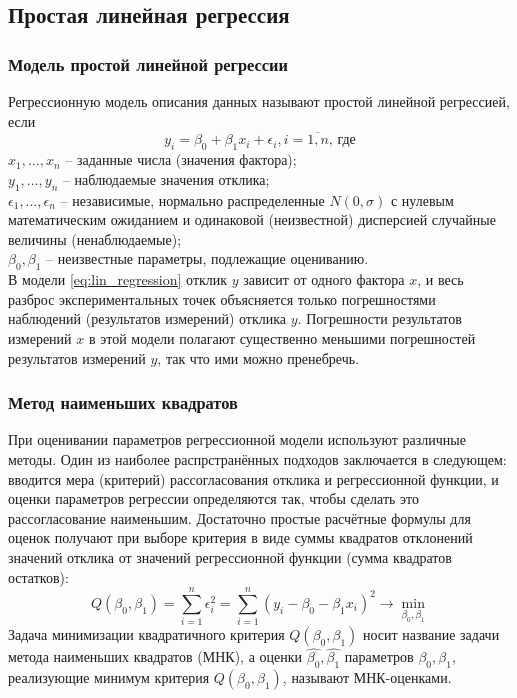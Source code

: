 \subsection{Простая линейная регрессия}

\subsubsection{Модель простой линейной регрессии}
Регрессионную модель описания данных называют простой линейной регрессией, если
\begin{equation} \label{eq:lin_regression}
	y_i = \beta_0 + \beta_1 x_i + \epsilon_i, i=\overline{1, n} \text{, где}
\end{equation}
$x_1, \dots, x_n$ -- заданные числа (значения фактора); \\
$y_1, \dots, y_n$ -- наблюдаемые значения отклика; \\
$\epsilon_1, \dots, \epsilon_n$ -- независимые, нормально распределенные $N(0, \sigma)$ с нулевым математическим ожиданием и одинаковой (неизвестной) дисперсией случайные величины (ненаблюдаемые); \\
$\beta_0, \beta_1$ -- неизвестные параметры, подлежащие оцениванию. \\
В модели \eqref{eq:lin_regression} отклик $y \text { зависит от одного фактора } x$, и весь разброс экспериментальных  точек объясняется только погрешностями наблюдений (результатов измерений) отклика $y$. Погрешности результатов измерений $x$ в этой модели полагают существенно меньшими погрешностей результатов измерений $y$, так что ими можно пренебречь.

\subsubsection{Метод наименьших квадратов}
При оценивании параметров регрессионной модели используют различные методы. Один из наиболее распрстранённых подходов заключается в следующем: вводится мера (критерий) рассогласования отклика и регрессионной функции, и оценки параметров регрессии определяются так, чтобы сделать это рассогласование наименьшим. Достаточно простые расчётные формулы для оценок получают при выборе критерия в виде суммы квадратов отклонений значений отклика от значений регрессионной функции (сумма квадратов остатков):
\begin{equation} \label{eq:least_squares_method}
	Q(\beta_0, \beta_1) = \sum_{i=1}^{n} \epsilon_{i}^2 = \sum_{i=1}^{n} (y_i - \beta_0 - \beta_1 x_i)^2 \rightarrow \min\limits_{\beta_0, \beta_1}
\end{equation}
Задача минимизации квадратичного критерия $Q(\beta_0, \beta_1)$ носит название задачи метода наименьших квадратов (МНК), а оценки $\hat{\beta_0}, \hat{\beta_1}$ параметров $\beta_0, \beta_1$, реализующие минимум критерия $Q(\beta_0, \beta_1)$, называют МНК-оценками.

